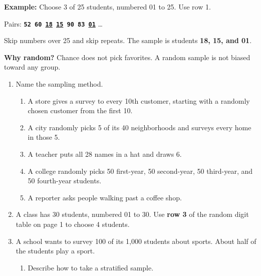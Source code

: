 \documentclass[11pt]{article}
\begin{document}
\textbf{Example:} Choose 3 of 25 students, numbered 01 to 25. Use row 1.

\vspace{0.2em}
Pairs: \texttt{\bfseries 52 60 \underline{18} \underline{15} 90 83 \underline{01}} \ldots\par\vspace{0.2em}
Skip numbers over 25 and skip repeats. The sample is students \textbf{18, 15, and 01}.

\vspace{0.8em}
\textbf{Why random?} Chance does not pick favorites. A random sample is not biased toward any group.

\partner

\newpage
\begin{enumerate}

\item Name the sampling method.
\begin{enumerate}[itemsep=2em]
  \item A store gives a survey to every 10th customer, starting with a randomly chosen customer from the first 10.

  \item A city randomly picks 5 of its 40 neighborhoods and surveys every home in those 5.

  \item A teacher puts all 28 names in a hat and draws 6.

  \item A college randomly picks 50 first-year, 50 second-year, 50 third-year, and 50 fourth-year students.

  \item A reporter asks people walking past a coffee shop.

\end{enumerate}
\work{1.5em}

\item A class has 30 students, numbered 01 to 30. Use \textbf{row 3} of the random digit table on page 1 to choose 4 students.

\work{4em}

\newpage
\item A school wants to survey 100 of its 1,000 students about sports. About half of the students play a sport.
\begin{enumerate}[itemsep=1em]
  \item Describe how to take a stratified sample.


\end{enumerate}
\end{enumerate}
\end{document}
